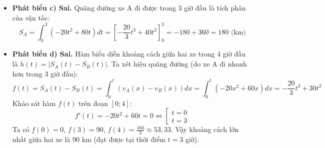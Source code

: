 \begin{ex}
{\begin{itemize}
            Vậy $v_A(t) = -20t^2 + 80t$. 
            Đỉnh của parabol đạt tại $t = -\frac{b}{2a} = 2$. Vận tốc lớn nhất của xe A là $v_A(2) = -20(2)^2 + 80(2) = 80$ (km/h).
            \item \textbf{Phát biểu c) Sai.} Quãng đường xe A đi được trong 3 giờ đầu là tích phân của vận tốc:
            $$ S_A = \int_{0}^{3} (-20t^2 + 80t) dt = \left[ -\frac{20}{3}t^3 + 40t^2 \right]_{0}^{3} = -180 + 360 = 180 \text{ (km)} $$
            \item \textbf{Phát biểu d) Sai.} Hàm biểu diễn khoảng cách giữa hai xe trong 4 giờ đầu là $h(t) = |S_A(t) - S_B(t)|$.
            Ta xét hiệu quãng đường (do xe A đi nhanh hơn trong 3 giờ đầu):
            $$ f(t) = S_A(t) - S_B(t) = \int_{0}^{t} (v_A(x) - v_B(x)) dx = \int_{0}^{t} (-20x^2 + 60x) dx = -\frac{20}{3}t^3 + 30t^2 $$
            Khảo sát hàm $f(t)$ trên đoạn $[0; 4]$:
            $$ f'(t) = -20t^2 + 60t = 0 \Leftrightarrow \left[ \begin{array}{l} t = 0 \\ t = 3 \end{array} \right. $$
            Ta có $f(0) = 0$, $f(3) = 90$, $f(4) = \frac{160}{3} \approx 53,33$.
            Vậy khoảng cách lớn nhất giữa hai xe là 90 km (đạt được tại thời điểm $t = 3$ giờ).
        \end{itemize}
    }
\end{ex}
